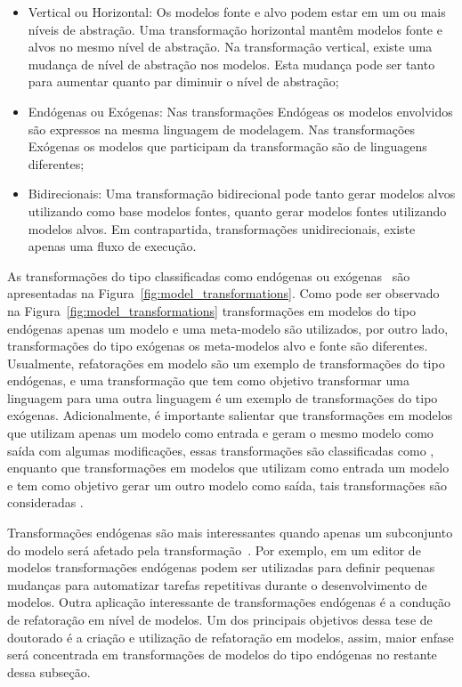 \begin{itemize}
	\item Vertical ou Horizontal: Os modelos fonte e alvo podem estar em um ou mais níveis de abstração. Uma transformação horizontal mantêm modelos fonte e alvos no mesmo nível de abstração. Na transformação vertical, existe uma mudança de nível de abstração nos modelos. Esta mudança pode ser tanto para aumentar quanto par diminuir o nível de abstração;
	\item  Endógenas ou Exógenas: Nas transformações Endógeas os modelos envolvidos são expressos na mesma linguagem de modelagem. Nas transformações Exógenas os modelos que participam da transformação são de linguagens diferentes;
	\item Bidirecionais: Uma transformação bidirecional pode tanto gerar modelos alvos utilizando como base modelos fontes, quanto gerar modelos fontes utilizando modelos alvos. Em contrapartida, transformações unidirecionais, existe apenas uma fluxo de execução. 
\end{itemize}

As transformações do tipo classificadas como endógenas ou exógenas~\cite{Brambilla_2012} são apresentadas na Figura~\ref{fig:model_transformations}. Como pode ser observado na Figura~\ref{fig:model_transformations} transformações em modelos do tipo endógenas apenas um modelo e uma meta-modelo são utilizados, por outro lado, transformações do tipo exógenas os meta-modelos alvo e fonte são diferentes. Usualmente, refatorações em modelo são um exemplo de transformações do tipo endógenas, e uma transformação que tem como objetivo transformar uma linguagem para uma outra linguagem é um exemplo de transformações do tipo exógenas. Adicionalmente, é importante salientar que transformações em modelos que utilizam apenas um modelo como entrada e geram o mesmo modelo como saída com algumas modificações, essas transformações são classificadas como , enquanto que transformações em modelos que utilizam como entrada um modelo e tem como objetivo gerar um outro modelo como saída, tais transformações são consideradas . 

Transformações endógenas são mais interessantes quando apenas um subconjunto do modelo será afetado pela transformação~\cite{Brambilla_2012}. Por exemplo, em um editor de modelos transformações endógenas podem ser utilizadas para definir pequenas mudanças para automatizar tarefas repetitivas durante o desenvolvimento de modelos. Outra aplicação interessante de transformações endógenas é a condução de refatoração em nível de modelos. Um dos principais objetivos dessa tese de doutorado é a criação e utilização de refatoração em modelos, assim, maior enfase será concentrada em transformações de modelos do tipo endógenas no restante dessa subseção.

